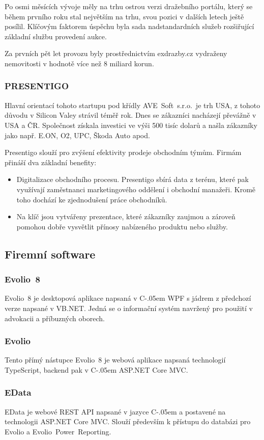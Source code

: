 \documentclass[czech,bachelorpractice,dept460,male,csharp]{diploma}
\newcommand{\AveSoft}{AVE~Soft~s.r.o.}
\newcommand{\EvolioEight}{Evolio~8}
\newcommand{\EFilters}{Evolio~Power~Reporting}
\newcommand{\EvolioX}{Evolio}
\newcommand{\EData}{EData}
\newcommand{\Csharp}{%
  {\settoheight{\dimen0}{C}C\kern-.05em \resizebox{!}{\dimen0}{\raisebox{\depth}{\#}}}}
\begin{document}
		Po osmi měsících vývoje měly na trhu ostrou verzi dražebního portálu, který se během prvního roku stal největším na trhu, svou pozici v dalších letech ještě posílil. Klíčovým faktorem úspěchu byla sada nadstandardních služeb rozšiřující základní službu provedení aukce.

		Za prvních pět let provozu byly prostřednictvím exdrazby.cz vydraženy nemovitosti v hodnotě více než 8 miliard korun.
 		\subsubsection{PRESENTIGO}
 		Hlavní orientací tohoto startupu pod křídly \AveSoft\ je trh USA, z tohoto důvodu v Silicon Valey strávil téměř rok. Dnes se zákazníci nacházejí převážně v USA a ČR. Společnost získala investici ve výši 500 tisíc dolarů a našla zákazníky jako např. E.ON, O2, UPC, Škoda Auto apod.

		Presentigo slouží pro zvýšení efektivity prodeje obchodním týmům. Firmám přináší dva základní benefity:
		\begin{itemize}
			\item
			Digitalizace obchodního procesu. Presentigo sbírá data z terénu, které pak využívají zaměstnanci marketingového oddělení i obchodní manažeři. Kromě toho dochází ke zjednodušení práce obchodníků.
			\item
			Na klíč jsou vytvářeny prezentace, které zákazníky zaujmou a zároveň pomohou dobře vysvětlit přínosy nabízeného produktu nebo služby.
		\end{itemize}
	\subsection{Firemní software}
		\subsubsection{\EvolioEight}
		{\EvolioEight} je desktopová aplikace napsaná v {\Csharp} WPF s jádrem z předchozí verze napsané v VB.NET. Jedná se o informační systém navržený pro použití v advokacii a příbuzných oborech. 
		\subsubsection{\EvolioX}
		Tento přímý nástupce {\EvolioEight} je webová aplikace napsaná technologií TypeScript, backend pak v {\Csharp} ASP.NET Core MVC.
		\subsubsection{\EData}
		{\EData} je webové REST API napsané v jazyce {\Csharp} a postavené na technologii ASP.NET Core MVC.
		Slouží především k přístupu do databázi pro {\EvolioX} a {\EFilters}.
\end{document}
